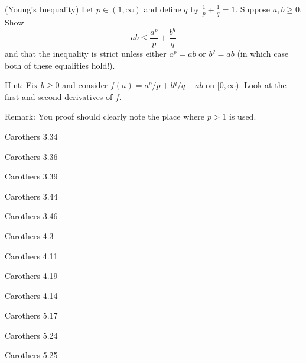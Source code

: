 \documentclass[minion]{homework641}
\begin{document}
\begin{aproblems}

\hproblem (Young's Inequality)
Let $p\in (1,\infty)$ and define $q$ by $\frac{1}{p}+\frac{1}{q}=1$.  
Suppose $a,b\ge 0$.  Show
\[
ab \le \frac{a^p }{p} + \frac{b^q }{q}
\]
and that the inequality is strict unless either $a^{p}=ab$ or $b^{q}=ab$
(in which case both of these equalities hold!).

Hint: Fix $b\ge0$ and
consider $f(a)=a^p/p+b^q/q-ab$ on $[0,\infty)$.  Look at the first and
second derivatives of $f$.

Remark: You proof should clearly note the place where $p>1$ is used.

\hproblem Carothers 3.34

\hproblem Carothers 3.36

\hproblem Carothers 3.39

\hproblem Carothers 3.44

\hproblem Carothers 3.46

\hproblem Carothers 4.3

\hproblem Carothers 4.11

\hproblem Carothers 4.19

\hproblem Carothers 4.14

\hproblem Carothers 5.17

\hproblem Carothers 5.24

\hproblem Carothers 5.25

\end{aproblems}
\end{document}
